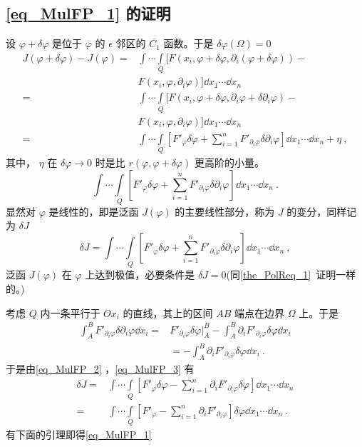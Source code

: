 \subsection{\autoref{eq_MulFP_1} 的证明}
设 $\varphi+\delta\varphi$ 是位于 $\varphi$ 的 $\epsilon$ 邻区的 $\overline{C_1}$ 函数。于是 $\delta{\varphi}(\Omega)=0$
\begin{equation}
\begin{aligned}
J(\varphi+\delta\varphi)-J(\varphi)=&\int\cdots\int\limits_Q [F(x_i,\varphi+\delta\varphi,\partial_i(\varphi+\delta\varphi))-\\
&F(x_i,\varphi,\partial_i\varphi)]\dd x_1\cdots\dd x_n\\
=&\int\cdots\int\limits_Q [F(x_i,\varphi+\delta\varphi,\partial_i\varphi+\delta\partial_i\varphi)-\\
&F(x_i,\varphi,\partial_i\varphi)]\dd x_1\cdots\dd x_n\\
=&\int\cdots\int\limits_Q [F'_\varphi\delta\varphi+\sum_{i=1}^nF'_{\partial_i\varphi}\delta\partial_i\varphi]\dd x_1\cdots\dd x_n+\eta~,
\end{aligned}
\end{equation}
其中， $\eta$ 在 $\delta\varphi\rightarrow0$ 时是比 $r(\varphi,\varphi+\delta\varphi)$ 更高阶的小量。
\begin{equation}
\int\cdots\int\limits_Q [F'_\varphi\delta\varphi+\sum_{i=1}^nF'_{\partial_i\varphi}\delta\partial_i\varphi]\dd x_1\cdots\dd x_n~.
\end{equation}
显然对 $\varphi$ 是线性的，即是泛函 $J(\varphi)$ 的主要线性部分，称为 $J$ 的变分，同样记为 $\delta J$
\begin{equation}\label{eq_MulFP_2}
\delta J=\int\cdots\int\limits_Q [F'_\varphi\delta\varphi+\sum_{i=1}^nF'_{\partial_i\varphi}\delta\partial_i\varphi]\dd x_1\cdots\dd x_n~,
\end{equation}
泛函 $J(\varphi)$ 在 $\varphi$ 上达到极值，必要条件是 $\delta J=0$(同\autoref{the_PolReq_1}~证明一样的。)

考虑 $Q$ 内一条平行于 $Ox_i$ 的直线，其上的区间 $AB$ 端点在边界 $\Omega$ 上。于是
\begin{equation}\label{eq_MulFP_3}
\begin{aligned}
\int_A^B F'_{\partial_i\varphi}\delta\partial_i\varphi\dd x_i=&F'_{\partial_i\varphi}\delta\varphi\Big|_A^B-\int_A^B \partial_iF'_{\partial_i\varphi}\delta\varphi\dd x_i\\
&=-\int_A^B \partial_iF'_{\partial_i\varphi}\delta\varphi\dd x_i~.
\end{aligned}
\end{equation}
于是由\autoref{eq_MulFP_2} ，\autoref{eq_MulFP_3} 有
\begin{equation}
\begin{aligned}
\delta J=&\int\cdots\int\limits_Q [F'_\varphi\delta\varphi-\sum_{i=1}^n\partial_iF'_{\partial_i\varphi}\delta\varphi]\dd x_1\cdots\dd x_n\\
=&\int\cdots\int\limits_Q [F'_\varphi-\sum_{i=1}^n\partial_iF'_{\partial_i\varphi}]\delta\varphi\dd x_1\cdots\dd x_n~.
\end{aligned}
\end{equation}
有下面的引理即得\autoref{eq_MulFP_1} 

